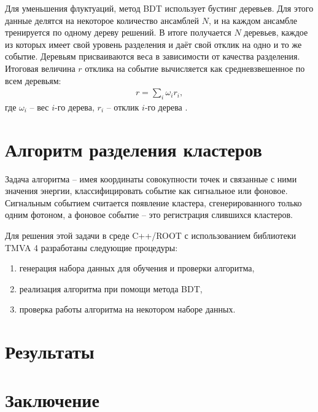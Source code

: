 \documentclass[14pt]{extarticle}
\begin{document}
Для уменьшения флуктуаций, метод BDT использует бустинг деревьев. Для этого данные делятся на некоторое количество ансамблей $N$, и на каждом ансамбле тренируется по одному дереву решений. В итоге получается $N$ деревьев, каждое из которых имеет свой уровень разделения и даёт свой отклик на одно и то же событие. Деревьям присваиваются веса в зависимости от качества разделения. Итоговая величина $r$ отклика на событие вычисляется как средневзвешенное по всем деревьям:
\begin{align*}
r = \sum_i \omega_i r_i,
\end{align*}
где $\omega_i$ -- вес $i$-го дерева, $r_i$ -- отклик $i$-го дерева \cite{tmva4}.
\section{Алгоритм разделения кластеров}
Задача алгоритма -- имея координаты совокупности точек и связанные с ними значения энергии, классифицировать событие как сигнальное или фоновое. Сигнальным событием считается появление кластера, сгенерированного только одним фотоном, а фоновое событие -- это регистрация слившихся кластеров.

Для решения этой задачи в среде C++/ROOT с использованием библиотеки TMVA 4 разработаны следующие процедуры:
\begin{enumerate}
	\item генерация набора данных для обучения и проверки алгоритма,
	\item реализация алгоритма при помощи метода BDT,
	\item проверка работы алгоритма на некотором наборе данных.
\end{enumerate}


\section{Результаты}
\section{Заключение}




\end{document}
